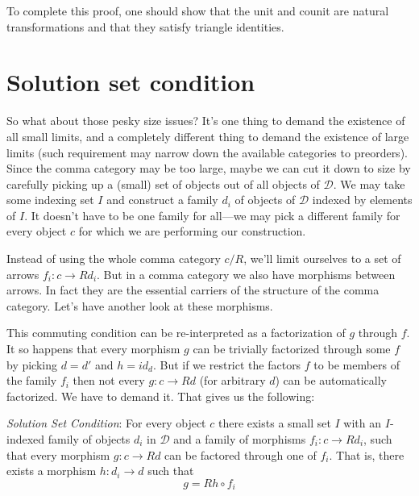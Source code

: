 \documentclass[11pt]{amsart}
\begin{document}
To complete this proof, one should show that the unit and counit are natural transformations and that they satisfy triangle identities. 

\section{Solution set condition}

So what about those pesky size issues? It's one thing to demand the existence of all small limits, and a completely different thing to demand the existence of large limits (such requirement may narrow down the available categories to preorders). Since the comma category may be too large, maybe we can cut it down to size by carefully picking up a (small) set of objects out of all objects of $\mathcal D$. We may take some indexing set $I$ and construct a family $d_i$ of objects of $\mathcal D$ indexed by elements of $I$. It doesn't have to be one family for all---we may pick a different family for every object $c$ for which we are performing our construction. 

Instead of using the whole comma category $c/R$, we'll limit ourselves to a set of arrows $f_i \colon c \to R d_i$. But in a comma category we also have morphisms between arrows. In fact they are the essential carriers of the structure of the comma category. Let's have another look at these morphisms.

\begin{figure}[H]
\centering
\end{figure}

This commuting condition can be re-interpreted as a factorization of $g$ through $f$. It so happens that every morphism $g$ can be trivially factorized through some $f$ by  picking $d = d'$ and $h = id_d$. But if we restrict the factors $f$ to be members of the family $f_i$ then not every $g \colon c \to R d$  (for arbitrary $d$) can be automatically factorized. We have to demand it. That gives us the following:

\emph{Solution Set Condition}: For every object $c$ there exists a small set $I$ with an $I$-indexed family of objects $d_i$ in $\mathcal D$ and a family of morphisms $f_i \colon c \to R d_i$, such that every morphism $g \colon c \to R d$ can be factored through one of $f_i$. That is, there exists a morphism $h \colon d_i \to d$ such that
\[g = R h \circ f_i \]
\end{document}
